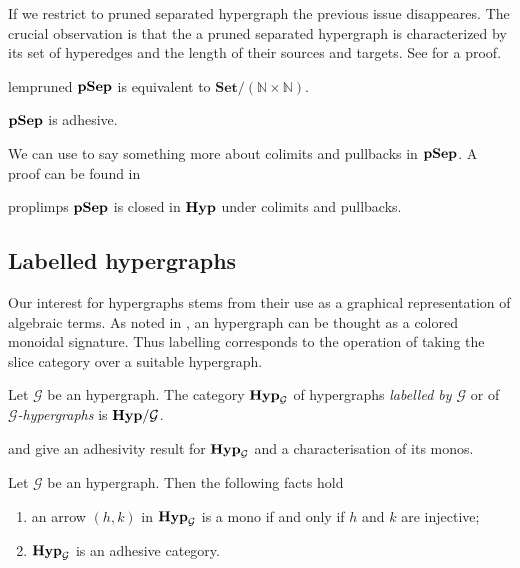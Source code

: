 \documentclass[3p]{elsarticle}
\newcommand{\Set}{\mathbf{Set}}
\newcommand{\catname}[1]{\textbf{\textup{#1}}}
\newcommand{\hyp}{\catname{Hyp}}
\newcommand{\pshyp}{\catname{pSep}}
\theoremstyle{remark}
\theoremstyle{definition}
\begin{document}
\smallskip
If we restrict to pruned separated hypergraph the previous issue disappeares.  The crucial observation is that the a pruned separated hypergraph is characterized by its set of hyperedges and the length of their sources and targets. See  for a proof.

\begin{restatable}{lem}{pruned}\label{lem:pruned}
$\pshyp$ is equivalent to $\Set/(\mathbb{N}\times \mathbb{N})$.
\end{restatable}
\begin{cor}\label{cor:pruned}
	$\pshyp$ is adhesive.
\end{cor}


We can use  to say something more about colimits and pullbacks in $\pshyp$. A proof can be found in 

\begin{restatable}{prop}{limps}\label{prop:limpsy}
	$\pshyp$ is closed in $\hyp$ under colimits and pullbacks.
\end{restatable}


\subsection{Labelled hypergraphs}\label{sssect:hyp_alg_sign}

Our interest for hypergraphs stems from their use as a graphical representation of algebraic terms. As  noted in , an hypergraph can be thought as a colored monoidal signature. Thus labelling corresponds to the operation of taking the slice category over a suitable hypergraph. 

\begin{defi}
	Let $\mathcal{G}$ be an hypergraph. The category $\hyp_\mathcal{G}$ of hypergraphs \emph{labelled by $\mathcal{G}$}  or of \emph{$\mathcal{G}$-hypergraphs} is $\hyp/\mathcal{G}$.
\end{defi}


 and  give an adhesivity result for $\hyp_{\mathcal{G}}$ and a characterisation of its monos.

\begin{prop}\label{prop:mono} Let $\mathcal{G}$ be an hypergraph. Then the following facts hold
	\begin{enumerate}
		\item an arrow $(h,k)$ in $\hyp_{\mathcal{G}}$ is a mono if and only if $h$ and $k$ are injective;
		\item $\hyp_{\mathcal{G}}$ is an adhesive category. 
	\end{enumerate}
\end{prop}
\end{document}
